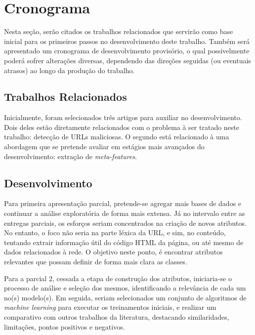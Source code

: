 \documentclass[manuscript,screen,review]{acmart}
\begin{document}
\pagebreak

\section{Cronograma}

Nesta seção, serão citados os trabalhos relacionados que servirão como base inicial para os primeiros passos no desenvolvimento deste trabalho. Também será apresentado um cronograma de desenvolvimento provisório, o qual possivelmente poderá sofrer alterações diversas, dependendo das direções seguidas (ou eventuais atrasos) ao longo da produção do trabalho.

\subsection{Trabalhos Relacionados}

Inicialmente, foram selecionados três artigos para auxiliar no desenvolvimento. Dois deles \cite{10.1145/3548606.3560615} \cite{10.1145/3465481.3470029} estão diretamente relacionados com o problema à ser tratado neste trabalho: detecção de URLs maliciosas. O segundo \cite{10.5555/3455716.3455827} está relacionado à uma abordagem que se pretende avaliar em estágios mais avançados do desenvolvimento: extração de \emph{meta-features}.

\subsection{Desenvolvimento}

Para primeira apresentação parcial, pretende-se agregar mais bases de dados e continuar a análise exploratória de forma mais extensa. Já no intervalo entre as entregas parciais, os esforços seriam concentrados na criação de novos atributos. No entanto, o foco não seria na parte léxica da URL, e sim, no conteúdo, tentando extrair informação útil do código HTML da página, ou até mesmo de dados relacionados à rede. O objetivo neste ponto, é encontrar atributos relevantes que possam definir de forma mais clara as classes.

Para a parcial 2, cessada a etapa de construção dos atributos, iniciaria-se o processo de análise e seleção dos mesmos, identificando a relevância de cada um no(s) modelo(s). Em seguida, seriam selecionados um conjunto de algoritmos de \emph{machine learning} para executar os treinamentos iniciais, e realizar um comparativo com outros trabalhos da literatura, destacando similaridades, limitações, pontos positivos e negativos.
\end{document}
